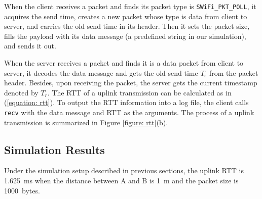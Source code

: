 \documentclass{article}
\begin{document}
When the client receives a packet and finds its packet type is
\lstinline|SWiFi_PKT_POLL|, it acquires the send time, creates a new packet whose type is
data from client to server, and carries the old send time in its
header. Then it sets the packet size, fills the payload with its data message
(a predefined string in our simulation), and sends it out.

When the server receives a packet and finds it is a data packet from client to
server, it decodes the data message and gets the old send time $T_\text{s}$ from
the packet header. Besides, upon receiving the packet, the server gets the current timestamp denoted by $T_r$. The RTT of a uplink transmission can be calculated as in (\ref{equation: rtt}).
To output the RTT information into a log file, the client calls \lstinline|recv| with the data message and RTT as the arguments. The process of a uplink transmission is summarized in Figure \ref{figure: rtt}(b).

\subsection{Simulation Results}
Under the simulation setup described in previous sections, the uplink RTT is \SI{1.625}{ms} when the distance between A and B is \SI{1}{m} and the packet size is \SI{1000}{bytes}. \\
\end{document}
